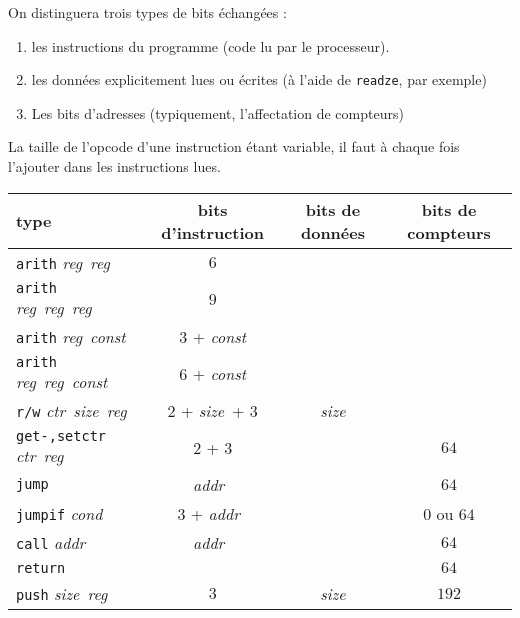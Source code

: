 \documentclass[architecture]{compas2018}
\newcommand{\reg}{\textit{reg}}
\newcommand{\const}{\textit{const}}
\newcommand{\cond}{\textit{cond}}
\newcommand{\ctr}{\textit{ctr}}
\newcommand{\size}{\textit{size}}
\newcommand{\addr}{\textit{addr}}
\begin{document}
\begin{table}[!h]
  On distinguera trois types de bits échangées :
  \begin{enumerate}
  \item les instructions du programme (code lu par le processeur).
  \item les données explicitement lues ou écrites (à l'aide de \texttt{readze}, par exemple)
  \item Les bits d'adresses (typiquement, l'affectation de compteurs)
  \end{enumerate}
La taille de l'opcode d'une instruction étant variable, il faut à chaque fois l'ajouter dans les instructions lues.
  \begin{center}
  \begin{tabular}{|l|c|c|c|}
    \hline  
    type & bits d'instruction & bits de données & bits de compteurs \\
    \hline  
    \hline
    \texttt{arith} \reg\ \reg\ & $6$                &    &      \\
    \hline
    \texttt{arith} \reg\ \reg\ \reg\   & $9$   &    &      \\
    \hline
    \texttt{arith} \reg\ \const\       & $3$ + \const       &    &      \\
    \hline
    \texttt{arith} \reg\ \reg\ \const\ & $6$ + \const       &    &      \\
    \hline
    \texttt{r/w} \ctr\ \size\ \reg     & $2$ + \size\ + $3$ & \size           &      \\
    \hline
    \texttt{get-,setctr} \ctr\ \reg\   & $2$ + $3$          &    & $64$              \\
    \hline
    \texttt{jump}         & \addr\             &    & $64$              \\
    \hline
    \texttt{jumpif} \cond & $3$ + \addr\       &    & $0$ ou $64$       \\
    \hline
    \texttt{call} \addr   & \addr\             &    & $64$              \\
    \hline
    \texttt{return}       &       &    & $64$              \\
    \hline
    \texttt{push} \size\ \reg          & $3$   & \size           & $192$             \\
    \hline
  \end{tabular}
  \end{center}


\end{table}
\end{document}
